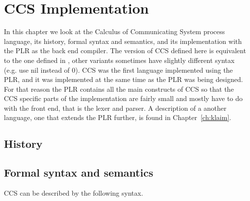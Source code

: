 \chapter{CCS Implementation}

In this chapter we look at the Calculus of Communicating System process language, its history, formal syntax and semantics, and its implementation with the PLR as the back end compiler. The version of CCS defined here is equivalent to the one defined in \cite{reactive}, other variants sometimes have slightly different syntax (e.g. use \textsf{nil} instead of 0). CCS was the first language implemented using the PLR, and it was implemented at the same time as the PLR was being designed. For that reason the PLR contains all the main constructs of CCS so that the CCS specific parts of the implementation are fairly small and mostly have to do with the front end, that is the lexer and parser. A description of a another language, one that extends the PLR further, is found in Chapter~\ref{ch:klaim}.

\section{History}

\section{Formal syntax and semantics}\label{sec:ccs_syntax}

CCS can be described by the following syntax.

